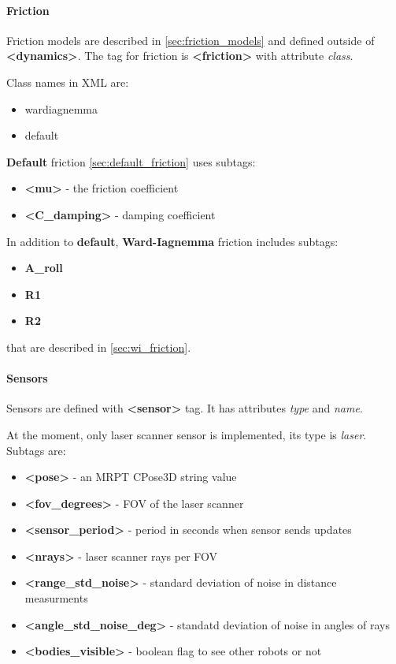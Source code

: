 \documentclass[a4paper,11pt]{article}
\begin{document}
\paragraph{Friction}
Friction models are described in \ref{sec:friction_models} and defined outside of \textbf{\textless dynamics\textgreater}.
The tag for friction is \textbf{\textless friction\textgreater} with attribute \textit{class}.

Class names in XML are:
\begin{itemize}
	\item wardiagnemma
	\item default
\end{itemize}

\textbf{Default} friction \ref{sec:default_friction} uses subtags:
\begin{itemize}
	\item \textbf{\textless mu\textgreater} - the friction coefficient
	\item \textbf{\textless C\_damping\textgreater} - damping coefficient
\end{itemize}

In addition to \textbf{default}, \textbf{Ward-Iagnemma} friction includes subtags:
\begin{itemize}
	\item \textbf{A\_roll}
	\item \textbf{R1}
	\item \textbf{R2}
\end{itemize}
that are described in \ref{sec:wi_friction}.

\paragraph{Sensors}
Sensors are defined with \textbf{\textless sensor\textgreater} tag. It has attributes \textit{type} and \textit{name}.

At the moment, only laser scanner sensor is implemented, its type is \textit{laser}.
Subtags are:
\begin{itemize}
	\item \textbf{\textless pose\textgreater} - an MRPT CPose3D string value
	\item \textbf{\textless fov\_degrees\textgreater} - FOV of the laser scanner
	\item \textbf{\textless sensor\_period\textgreater} - period in seconds when sensor sends updates
	\item \textbf{\textless nrays\textgreater} - laser scanner rays per FOV
	\item \textbf{\textless range\_std\_noise\textgreater} - standard deviation of noise in distance measurments
	\item \textbf{\textless angle\_std\_noise\_deg\textgreater} - standatd deviation of noise in angles of rays
	\item \textbf{\textless bodies\_visible\textgreater} - boolean flag to see other robots or not
\end{itemize}
\end{document}
